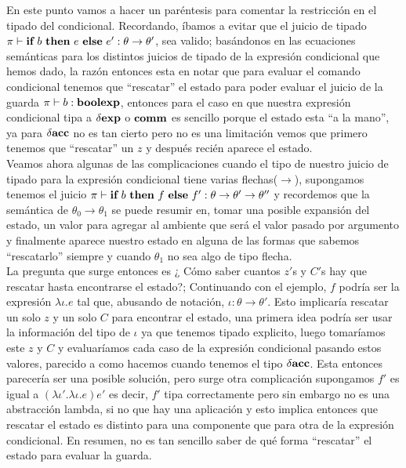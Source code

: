 En este punto vamos a hacer un par\'entesis para comentar la restricci\'on
en el tipado del condicional. Recordando, \'ibamos a evitar que el juicio de tipado
$\pi \vdash \textbf{if} \ b \ \textbf{then} \ e \ \textbf{else} \ e' : \theta \rightarrow \theta'$, 
sea valido; bas\'andonos en las ecuaciones sem\'anticas para los 
distintos juicios de tipado de la expresi\'on condicional que hemos
dado, la raz\'on entonces esta en notar que para evaluar el comando
condicional tenemos que ``rescatar'' el estado para poder evaluar
el juicio de la guarda $\pi \vdash b : \textbf{boolexp}$, entonces para
el caso en que nuestra expresi\'on condicional tipa a 
$\delta \textbf{exp}$ o $\textbf{comm}$ es sencillo porque el estado esta ``a la mano'',
ya para $\delta \textbf{acc}$ no es tan cierto pero no es una limitaci\'on vemos
que primero tenemos que ``rescatar'' un $z$ y despu\'es reci\'en aparece
el estado. \\
Veamos ahora algunas de las complicaciones cuando
el tipo de nuestro juicio de tipado para la expresi\'on condicional 
tiene varias flechas($\rightarrow$), supongamos tenemos el juicio
$\pi \vdash \textbf{if} \ b \ \textbf{then} \ f \ \textbf{else} \ f' : \theta \rightarrow \theta' \rightarrow \theta''$ y
recordemos que la sem\'antica de $\theta_0 \rightarrow \theta_1$ se puede 
resumir en, tomar una posible expansi\'on del estado, un valor para agregar 
al ambiente que
ser\'a el valor pasado por argumento y finalmente aparece nuestro estado 
en alguna de las formas que sabemos ``rescatarlo'' siempre y cuando $\theta_1$
no sea algo de tipo flecha.\\
La pregunta que surge entonces es 
¿ C\'omo saber cuantos $z'$s y $C'$s hay que rescatar hasta encontrarse el estado?; 
Continuando con el ejemplo, $f$ podr\'ia ser la expresi\'on $\lambda \iota. e$ tal que, 
abusando de notaci\'on, $\iota : \theta \rightarrow \theta'$. Esto 
implicar\'ia rescatar un solo $z$ y un solo $C$ para encontrar el estado, una 
primera idea podr\'ia ser usar la informaci\'on del tipo de $\iota$ ya que tenemos
tipado explicito, luego 
tomar\'iamos este $z$ y $C$ y evaluar\'iamos cada caso de la expresi\'on
condicional pasando estos valores, parecido a como hacemos cuando
tenemos el tipo $\delta \textbf{acc}$. Esta entonces parecer\'ia ser una posible 
soluci\'on, pero surge otra complicaci\'on supongamos $f'$ es igual a
$(\lambda \iota' . \lambda \iota . e)e'$ es decir, $f'$ tipa correctamente pero
sin embargo no es una abstracci\'on lambda, si no que hay una aplicaci\'on
y esto implica entonces que rescatar el estado es distinto para una componente
que para otra de la expresi\'on condicional. En resumen, no es tan sencillo
saber de qu\'e forma ``rescatar'' el estado para evaluar la guarda.\\

